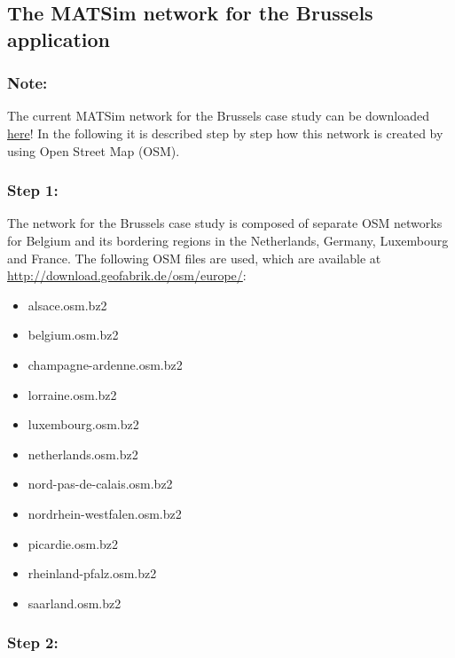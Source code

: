 \documentclass[a4paper,11pt]{report}
\begin{document}
\subsection{The MATSim network for the Brussels application}

\subsubsection{Note:}

The current MATSim network for the Brussels case study can be downloaded \href{https://svn.vsp.tu-berlin.de/repos/public-svn/matsim/examples/countries/be/brussels/network/belgium_incl_borderArea_hierarchylayer4_clean_simple.xml.gz}{here}! In the following it is described step by step how this network is created by using Open Street Map (OSM).

\subsubsection{Step 1:}

The network for the Brussels case study is composed of separate OSM  networks for Belgium and its bordering regions in the Netherlands,  Germany, Luxembourg and France. The following OSM files are used, which  are available at \href{http://download.geofabrik.de/osm/europe/}{http://download.geofabrik.de/osm/europe/}:
\begin{itemize}
	\item  alsace.osm.bz2
	\item  belgium.osm.bz2
	\item  champagne-ardenne.osm.bz2
	\item  lorraine.osm.bz2
	\item  luxembourg.osm.bz2
	\item  netherlands.osm.bz2
	\item  nord-pas-de-calais.osm.bz2
	\item  nordrhein-westfalen.osm.bz2
	\item  picardie.osm.bz2
	\item  rheinland-pfalz.osm.bz2
	\item  saarland.osm.bz2
\end{itemize}

\subsubsection{Step 2:}
\end{document}

